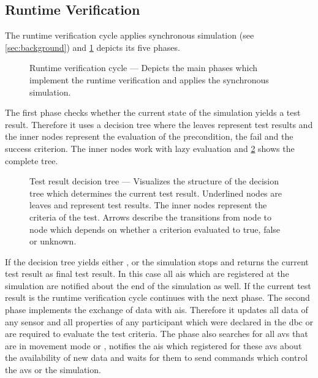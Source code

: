 \subsection{Runtime Verification}\label{sec:runtimeVerification}
The runtime verification cycle applies synchronous simulation (see \cref{sec:background}) and \cref{fig:runtimeVerification} depicts its five phases.
\begin{figure}
    \centering
    \medskip
    \caption{%
        Runtime verification cycle --- Depicts the main phases which implement the runtime verification and applies the synchronous simulation.
    }\label{fig:runtimeVerification}
\end{figure}
The first phase checks whether the current state of the simulation yields a test result.
Therefore it uses a decision tree where the leaves represent test results and the inner nodes represent the evaluation of the precondition, the fail and the success criterion.
The inner nodes work with lazy evaluation and \cref{fig:verificationDecision} shows the complete tree.
\begin{figure}
    \centering
    
    \medskip
    \caption{%
        Test result decision tree --- Visualizes the structure of the decision tree which determines the current test result.
        Underlined nodes are leaves and represent test results.
        The inner nodes represent the criteria of the test.
        Arrows describe the transitions from node to node which depends on whether a criterion evaluated to \colorbox{green!50}{true}, \colorbox{red!50}{false} or \colorbox{blue!40}{unknown}.
    }\label{fig:verificationDecision}
\end{figure}
If the decision tree yields either \trskipped{}, \trfailed{} or \trsucceeded{} the simulation stops and returns the current test result as final test result.
In this case all \glspl{ai} which are registered at the simulation are notified about the end of the simulation as well.
If the current test result is \trunknown{} the runtime verification cycle continues with the next phase.
The second phase implements the exchange of data with \glspl{ai}.
Therefore it updates all data of any sensor and all properties of any participant which were declared in the \gls{dbc} or are required to evaluate the test criteria.
The phase also searches for all \glspl{av} that are in movement mode \mmautonomous{} or \mmtraining{}, notifies the \glspl{ai} which registered for these \glspl{av} about the availability of new data and waits for them to send commands which control the \glspl{av} or the simulation.
